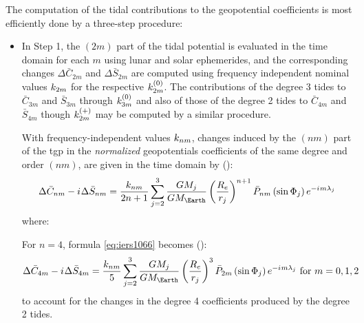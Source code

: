 The computation of the tidal contributions to the geopotential coefficients is 
most efficiently done by a three-step procedure:
\begin{itemize}
  \item In Step 1, the $(2m)$ part of the tidal potential is evaluated in the 
   time domain for each $m$ using lunar and solar ephemerides, and the 
   corresponding changes $\Delta \bar{C}_{2m}$ and $\Delta \bar{S}_{2m}$ are 
   computed using frequency independent nominal values $k _{2m}$ for the 
   respective $k ^{(0)}_{2m}$. The contributions of the degree 3 tides to
   $\bar{C}_{3m}$ and $\bar{S}_{3m}$ through $k ^{(0)}_{3m}$ and also of 
   those of the degree 2 tides to $\bar{C}_{4m}$ and $\bar{S}_{4m}$ though 
   $k ^{(+)}_{2m}$ may be computed by a similar procedure.

   With frequency-independent values $k _{nm}$, changes induced by the 
   $(nm)$ part of the \gls{tgp} in the \emph{normalized} geopotentials 
   coefficients of the same degree and order $(nm)$, are given in the time 
   domain by (\cite{iers2010}):
   \begin{equation}
    \Delta \bar{C}_{nm} - \iim \Delta \bar{S}_{nm} = \frac{\lovek _{nm}}{2n+1}
      \sum^{3}_{j=2} \frac{GM_j}{GM_\Earth} \left( \frac{R_e}{r_j} \right) ^{n+1} 
      \bar{P}_{nm} \left( \sin \Phi _j \right) e^{-\iim m \lambda _j}
      \label{eq:iers1066}
   \end{equation}
    where:

    For $n=4$, formula \ref{eq:iers1066} becomes (\cite{iers2010}):
    \begin{equation}
    \Delta \bar{C}_{4m} - \iim \Delta \bar{S}_{4m} = \frac{\lovek _{nm}}{5}
      \sum^{3}_{j=2} \frac{GM_j}{GM_\Earth} \left( \frac{R_e}{r_j} \right) ^{3} 
      \bar{P}_{2m} \left( \sin \Phi _j \right) e^{-\iim m \lambda _j} \text{ for } m=0,1,2
      \label{eq:iers1067}
    \end{equation}
    to account for the changes in the degree 4 coefficients produced by the 
    degree 2 tides.


\end{itemize}
